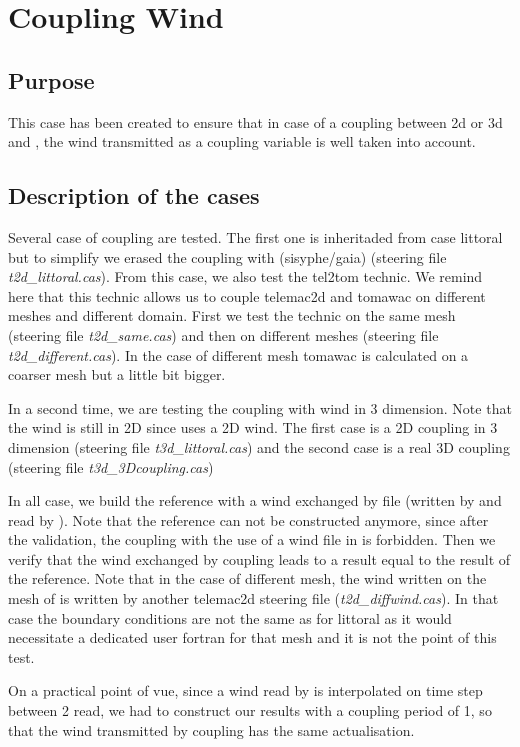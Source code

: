 \chapter{Coupling Wind}
\section{Purpose}
This case has been created to ensure that in case of a coupling between
\telemac2d or \telemac3d and \tomawac, the wind transmitted as a coupling
variable is well taken into account.

\section{Description of the cases}
  
Several case of coupling are tested. The first one is inheritaded from case
littoral but to simplify we erased the coupling with (sisyphe/gaia) (steering file
{\it t2d\_littoral.cas}). From this case, we also test the tel2tom technic. We
remind here that this technic allows us to couple telemac2d and tomawac on
different meshes and different domain. First we test the technic on the same mesh
(steering file {\it t2d\_same.cas}) and then on different meshes (steering file
{\it t2d\_different.cas}). In the case of different mesh tomawac is calculated on a
coarser mesh but a little bit bigger.  

In a second time, we are testing the coupling with wind in 3 dimension.
Note that the wind is still in 2D since \tomawac uses a 2D wind. The first case is
a 2D coupling in 3 dimension (steering file {\it t3d\_littoral.cas}) and the second
case is a real 3D coupling (steering file {\it t3d\_3Dcoupling.cas})

In all case, we build the reference with a wind exchanged by file (written by
\telemac and read by \tomawac). Note that the reference can not be constructed
anymore, since after the validation, the coupling with the use of a wind file
in \tomawac is forbidden. Then we verify that the wind exchanged by coupling
leads to a result equal to the result of the reference. Note that in the case of
different mesh, the wind written on the mesh of \tomawac is written by another
telemac2d steering file ({\it t2d\_diffwind.cas}). In that case the boundary
conditions are not the same as for littoral as it would necessitate a dedicated
user fortran for that mesh and it is not the point of this test. 

On a practical point of vue, since a wind read by \tomawac is interpolated on time
step between 2 read, we had to construct our results with a coupling period of 1,
so that the wind transmitted by coupling has the same actualisation. 

